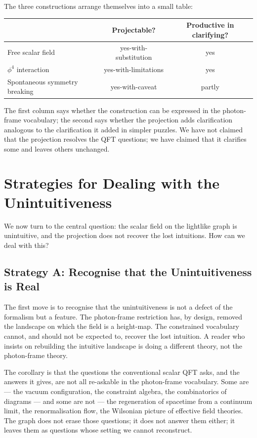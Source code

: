 \documentclass[11pt]{article}
\begin{document}
The three constructions arrange themselves into a small table:
\begin{center}
\begin{tabular}{lcc}
                                          & \textbf{Projectable?} & \textbf{Productive in clarifying?} \\ \hline
Free scalar field                          & yes-with-substitution & yes \\
$\phi^4$ interaction                       & yes-with-limitations  & yes \\
Spontaneous symmetry breaking             & yes-with-caveat       & partly
\end{tabular}
\end{center}
The first column says whether the construction can be expressed in the photon-frame vocabulary; the second says whether the projection adds clarification analogous to the clarification it added in simpler puzzles. We have not claimed that the projection resolves the QFT questions; we have claimed that it clarifies some and leaves others unchanged.

\section{Strategies for Dealing with the Unintuitiveness}
\label{sec:deal}

We now turn to the central question: the scalar field on the lightlike graph is unintuitive, and the projection does not recover the lost intuitions. How can we deal with this?

\subsection{Strategy A: Recognise that the Unintuitiveness is Real}

The first move is to recognise that the unintuitiveness is not a defect of the formalism but a feature. The photon-frame restriction has, by design, removed the landscape on which the field is a height-map. The constrained vocabulary cannot, and should not be expected to, recover the lost intuition. A reader who insists on rebuilding the intuitive landscape is doing a different theory, not the photon-frame theory.

The corollary is that the questions the conventional scalar QFT asks, and the answers it gives, are not all re-askable in the photon-frame vocabulary. Some are --- the vacuum configuration, the constraint algebra, the combinatorics of diagrams --- and some are not --- the regeneration of spacetime from a continuum limit, the renormalisation flow, the Wilsonian picture of effective field theories. The graph does not erase those questions; it does not answer them either; it leaves them as questions whose setting we cannot reconstruct.
\end{document}
